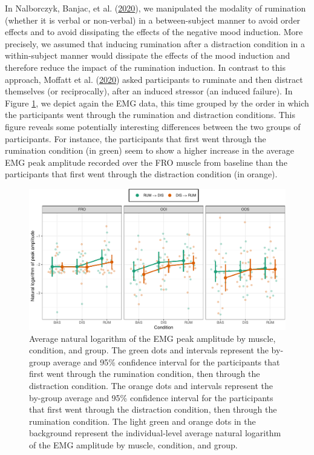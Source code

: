 \documentclass[
  english,
  man, donotrepeattitle,floatsintext]{apa6}
\begin{document}
In Nalborczyk, Banjac, et al. (\protect\hyperlink{ref-nalborczyk_dissociating_2020}{2020}), we manipulated the modality of rumination (whether it is verbal or non-verbal) in a between-subject manner to avoid order effects and to avoid dissipating the effects of the negative mood induction. More precisely, we assumed that inducing rumination after a distraction condition in a within-subject manner would dissipate the effects of the mood induction and therefore reduce the impact of the rumination induction. In contrast to this approach, Moffatt et al. (\protect\hyperlink{ref-moffatt_inner_2020}{2020}) asked participants to ruminate and then distract themselves (or reciprocally), after an induced stressor (an induced failure). In Figure \ref{fig:order}, we depict again the EMG data, this time grouped by the order in which the participants went through the rumination and distraction conditions. This figure reveals some potentially interesting differences between the two groups of participants. For instance, the participants that first went through the rumination condition (in green) seem to show a higher increase in the average EMG peak amplitude recorded over the FRO muscle from baseline than the participants that first went through the distraction condition (in orange).

\begin{figure}[!htb]

{\centering \includegraphics[width=1\linewidth]{manuscript_files/figure-latex/order-1} 

}

\caption{Average natural logarithm of the EMG peak amplitude by muscle, condition, and group. The green dots and intervals represent the by-group average and 95\% confidence interval for the participants that first went through the rumination condition, then through the distraction condition. The orange dots and intervals represent the by-group average and 95\% confidence interval for the participants that first went through the distraction condition, then through the rumination condition. The light green and orange dots in the background represent the individual-level average natural logarithm of the EMG amplitude by muscle, condition, and group.}\label{fig:order}
\end{figure}
\end{document}
